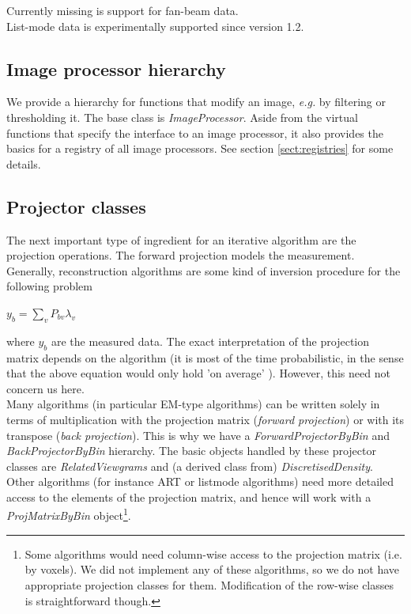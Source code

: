 \documentclass{article}
\begin{document}
Currently missing is support for fan-beam data.\\
List-mode data is experimentally supported since version 1.2.

\subsection{
Image processor hierarchy}

We provide a hierarchy for functions that modify an image, \textit{e.g.} by 
filtering or thresholding it. The base class is \textit{ImageProcessor}. 
Aside from the virtual functions that specify the interface to 
an image processor, it also provides the basics for a registry 
of all image processors. See section \ref{sect:registries} for some details.

\subsection{
Projector classes}

The next important type of ingredient for an iterative algorithm 
are the projection operations. The forward projection models 
the measurement. Generally, reconstruction algorithms are some 
kind of inversion procedure for the following problem


$y_{b} =\sum\limits_{v}P_{bv} \lambda _{v}  $


where $y_b$ are the measured data. The exact interpretation 
of the projection matrix depends on the algorithm (it is most 
of the time probabilistic, in the sense that the above equation 
would only hold 'on average' ). However, this need not concern 
us here.\\
Many algorithms (in particular EM-type algorithms) can be written 
solely in terms of multiplication with the projection matrix 
(\textit{forward projection}) or with its transpose (\textit{back projection}). 
This is why we have a \textit{ForwardProjectorByBin} and \textit{BackProjectorByBin} 
hierarchy. The basic objects handled by these projector classes 
are \textit{RelatedViewgrams} and (a derived class from) \textit{DiscretisedDensity}. 
Other algorithms (for instance ART or listmode algorithms) need 
more detailed access to the elements of the projection matrix, 
and hence will work with a \textit{ProjMatrixByBin} object\footnote{{\small Some 
algorithms would need column-wise access to the projection matrix 
(i.e. by voxels). We did not implement any of these algorithms, 
so we do not have appropriate projection classes for them. Modification 
of the row-wise classes is straightforward though.}}. 
\end{document}
